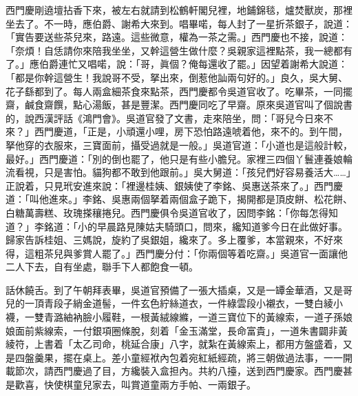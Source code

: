 西門慶剛遶壇拈香下來，被左右就請到松鶴軒閣兒裡，地鋪錦毯，爐焚獸炭，那裡坐去了。不一時，應伯爵、謝希大來到。唱畢喏，每人封了一星折茶銀子，說道：「實告要送些茶兒來，路遠。這些微意，權為一茶之需。」西門慶也不接，說道：「奈煩！自恁請你來陪我坐坐，又幹這營生做什麼？吳親家這裡點茶，我一總都有了。」應伯爵連忙又唱喏，說：「哥，眞個？俺每還收了罷。」因望着謝希大說道：「都是你幹這營生！我說哥不受，拏出來，倒惹他訕兩句好的。」{}良久，吳大舅、花子繇都到了。每人兩盒細茶食來點茶，西門慶都令吳道官收了。吃畢茶，一同擺齋，鹹食齋饌，點心湯飯，甚是豐潔。西門慶同吃了早齋。原來吳道官叫了個說書的，說西漢評話《鴻門會》。{}吳道官發了文書，走來陪坐，問：「哥兒今日來不來？」西門慶道，「正是，小頑還小哩，房下恐怕路遠唬着他，來不的。到午間，拏他穿的衣服來，三寶面前，攝受過就是一般。」吳道官道：「小道也是這般計較，最好。」西門慶道：「別的倒也罷了，他只是有些小膽兒。家裡三四個丫鬟連養娘輪流看視，只是害怕。貓狗都不敢到他跟前。」{}吳大舅道：「孩兒們好容易養活大……」正說着，只見玳安進來說：「裡邊桂姨、銀姨使了李銘、吳惠送茶來了。」西門慶道：「叫他進來。」李銘、吳惠兩個拏着兩個盒子跪下，揭開都是頂皮餅、松花餅、白糖萬壽糕、玫瑰搽穰捲兒。西門慶俱令吳道官收了，因問李銘：「你每怎得知道？」李銘道：「小的早晨路見陳姑夫騎頭口，問來，纔知道爹今日在此做好事。歸家告訴桂姐、三媽說，旋約了吳銀姐，纔來了。多上覆爹，本當親來，不好來得，這粗茶兒與爹賞人罷了。」西門慶分付：「你兩個等着吃齋。」吳道官一面讓他二人下去，自有坐處，聯手下人都飽食一頓。

話休饒舌。到了午朝拜表畢，吳道官預備了一張大插桌，又是一罈金華酒，又是哥兒的一頂青段子綃金道髻，一件玄色紵絲道衣，一件綠雲段小襯衣，一雙白綾小襪，一雙青潞紬衲臉小履鞋，一根黃絨線縧，一道三寶位下的黃線索，一道子孫娘娘面前紫線索，一付銀項圈條脫，刻着「金玉滿堂，長命富貴」，一道朱書闢非黃綾符，上書着「太乙司命，桃延合康」八字，就紮在黃線索上，都用方盤盛着，又是四盤羹果，擺在桌上。差小童經袱內包着宛紅紙經疏，將三朝做過法事，一一開載節次，請西門慶過了目，方纔裝入盒担內。共約八擡，送到西門慶家。西門慶甚是歡喜，快使棋童兒家去，叫賞道童兩方手帕、一兩銀子。

